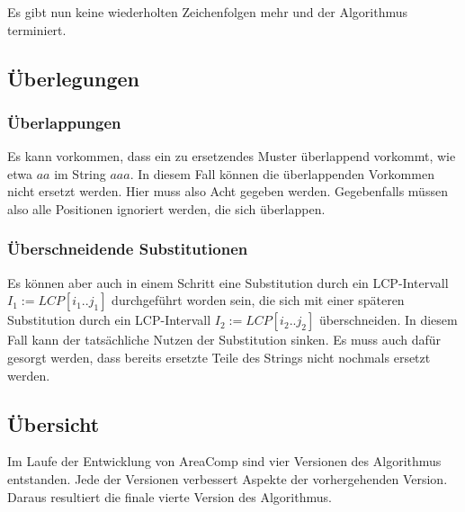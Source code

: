 Es gibt nun keine wiederholten Zeichenfolgen mehr und der Algorithmus terminiert.

\subsection{Überlegungen}

\subsubsection{Überlappungen}

Es kann vorkommen, dass ein zu ersetzendes Muster überlappend vorkommt, wie etwa $aa$ im String $aaa$. In diesem Fall können die überlappenden Vorkommen nicht ersetzt werden. Hier muss also Acht gegeben werden. Gegebenfalls müssen also alle Positionen ignoriert werden, die sich überlappen.

\subsubsection{Überschneidende Substitutionen}

Es können aber auch in einem Schritt eine Substitution durch ein LCP-Intervall $I_1 := LCP[i_1..j_1]$ durchgeführt worden sein, die sich mit einer späteren Substitution durch ein LCP-Intervall $I_2 := LCP[i_2..j_2]$ überschneiden. In diesem Fall kann der tatsächliche Nutzen der Substitution sinken. Es muss auch dafür gesorgt werden, dass bereits ersetzte Teile des Strings nicht nochmals ersetzt werden.

\subsection{Übersicht}

Im Laufe der Entwicklung von AreaComp sind vier Versionen des Algorithmus entstanden. Jede der Versionen verbessert Aspekte der vorhergehenden Version. Daraus resultiert die finale vierte Version des Algorithmus.

